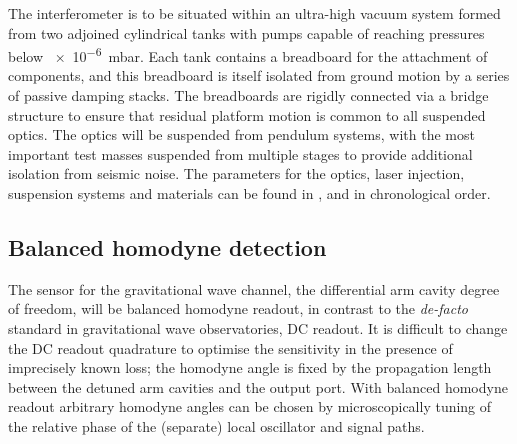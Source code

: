 The interferometer is to be situated within an ultra-high vacuum system formed from two adjoined cylindrical tanks with pumps capable of reaching pressures below \SI{e-6}{\milli\bar}. Each tank contains a breadboard for the attachment of components, and this breadboard is itself isolated from ground motion by a series of passive damping stacks. The breadboards are rigidly connected via a bridge structure to ensure that residual platform motion is common to all suspended optics. The optics will be suspended from pendulum systems, with the most important test masses suspended from multiple stages to provide additional isolation from seismic noise. The parameters for the optics, laser injection, suspension systems and materials can be found in \cite{Graef2014}, \cite{Danilishin2015} and \cite{Leavey2016} in chronological order.

\subsection{\label{sec:bhd-intro}Balanced homodyne detection}
The sensor for the gravitational wave channel, the differential arm cavity degree of freedom, will be balanced homodyne readout, in contrast to the \emph{de-facto} standard in gravitational wave observatories, \gls{DC} readout. It is difficult to change the \gls{DC} readout quadrature to optimise the sensitivity in the presence of imprecisely known loss; the homodyne angle is fixed by the propagation length between the detuned arm cavities and the output port. With balanced homodyne readout arbitrary homodyne angles can be chosen by microscopically tuning of the relative phase of the (separate) local oscillator and signal paths.


